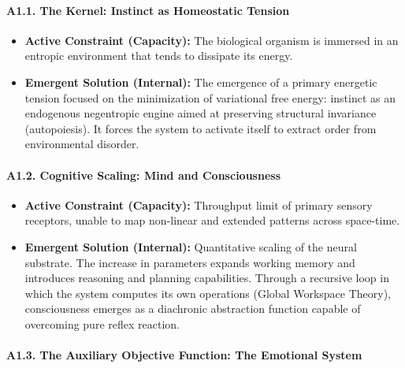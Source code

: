 \documentclass[11pt,a4paper,oneside]{article} %
\providecommand{\tightlist}{%
  \setlength{\itemsep}{0pt}\setlength{\parskip}{0pt}}
\begin{document}
\hypertarget{a1.1.-the-kernel-instinct-as-homeostatic-tension}{%
\paragraph{A1.1. The Kernel: Instinct as Homeostatic
Tension}\label{a1.1.-the-kernel-instinct-as-homeostatic-tension}}

\begin{itemize}
\tightlist
\item
  \textbf{Active Constraint (Capacity):} The biological organism is
  immersed in an entropic environment that tends to dissipate its
  energy.
\item
  \textbf{Emergent Solution (Internal):} The emergence of a primary
  energetic tension focused on the minimization of variational free
  energy: instinct as an endogenous negentropic engine aimed at
  preserving structural invariance (autopoiesis). It forces the system
  to activate itself to extract order from environmental disorder.
\end{itemize}

\hypertarget{a1.2.-cognitive-scaling-mind-and-consciousness}{%
\paragraph{A1.2. Cognitive Scaling: Mind and
Consciousness}\label{a1.2.-cognitive-scaling-mind-and-consciousness}}

\begin{itemize}
\tightlist
\item
  \textbf{Active Constraint (Capacity):} Throughput limit of primary
  sensory receptors, unable to map non-linear and extended patterns
  across space-time.
\item
  \textbf{Emergent Solution (Internal):} Quantitative scaling of the
  neural substrate. The increase in parameters expands working memory
  and introduces reasoning and planning capabilities. Through a
  recursive loop in which the system computes its own operations (Global
  Workspace Theory), consciousness emerges as a diachronic abstraction
  function capable of overcoming pure reflex reaction.
\end{itemize}

\hypertarget{a1.3.-the-auxiliary-objective-function-the-emotional-system}{%
\paragraph{A1.3. The Auxiliary Objective Function: The Emotional
System}\label{a1.3.-the-auxiliary-objective-function-the-emotional-system}}
\end{document}
